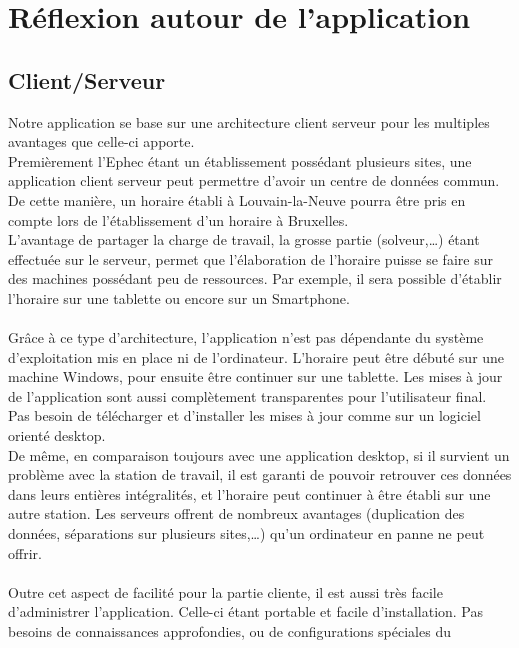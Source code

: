 
\chapter{Réflexion autour de l'application}

\section{Client/Serveur}
Notre application se base sur une architecture client serveur pour les multiples
avantages que celle-ci apporte.\\
Premièrement l'Ephec étant un établissement possédant plusieurs sites,
 une application client serveur peut permettre d'avoir un centre de données
 commun.
 De cette manière, un horaire établi à Louvain-la-Neuve pourra être pris en
 compte lors de l'établissement d'un horaire à Bruxelles.\\
L'avantage de partager la charge de travail, la grosse partie (solveur,…) étant
effectuée sur le serveur, permet que l'élaboration de l'horaire puisse se
faire sur des machines possédant peu de ressources. Par exemple, il sera
possible d'établir l'horaire sur une tablette ou encore sur un Smartphone.\\
\\
Grâce à ce type d'architecture, l'application n'est pas dépendante du système
d'exploitation mis en place ni de l'ordinateur. L'horaire peut être débuté sur
une machine Windows, pour ensuite être continuer sur une tablette.
Les mises à jour de l'application sont aussi complètement transparentes pour
l'utilisateur final. Pas besoin de télécharger et d'installer les mises à jour
comme sur un logiciel orienté desktop.\\
De même, en comparaison toujours avec une application desktop, si il survient un
problème avec la station de travail, il est garanti de pouvoir retrouver ces
données dans leurs entières intégralités, et l'horaire peut continuer à être établi
sur une autre station. Les serveurs offrent de nombreux avantages (duplication des
données, séparations sur plusieurs sites,…) qu'un ordinateur en panne ne peut offrir.\\
\\
Outre cet aspect de facilité pour la partie cliente, il est aussi très facile
d'administrer l'application. Celle-ci étant portable et facile d'installation.
Pas besoins de connaissances approfondies, ou de configurations spéciales du
